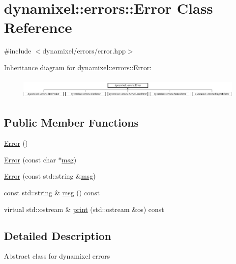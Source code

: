 \hypertarget{classdynamixel_1_1errors_1_1_error}{}\section{dynamixel\+:\+:errors\+:\+:Error Class Reference}
\label{classdynamixel_1_1errors_1_1_error}


{\ttfamily \#include $<$dynamixel/errors/error.\+hpp$>$}

Inheritance diagram for dynamixel\+:\+:errors\+:\+:Error\+:\begin{figure}[H]
\begin{center}
\leavevmode
\includegraphics[height=1.056604cm]{classdynamixel_1_1errors_1_1_error}
\end{center}
\end{figure}
\subsection*{Public Member Functions}
\begin{DoxyCompactItemize}
\item 
\hyperlink{classdynamixel_1_1errors_1_1_error_a7d5d5cc0fea73ae2db4ca84035c7fbfe}{Error} ()
\item 
\hyperlink{classdynamixel_1_1errors_1_1_error_ad41dbbe9f237dbc204eba731de65be5a}{Error} (const char $\ast$\hyperlink{classdynamixel_1_1errors_1_1_error_a4c0804f137545e62204c49fca4c30dcb}{msg})
\item 
\hyperlink{classdynamixel_1_1errors_1_1_error_ab404696702c69bd2e8c49f6032a718f8}{Error} (const std\+::string \&\hyperlink{classdynamixel_1_1errors_1_1_error_a4c0804f137545e62204c49fca4c30dcb}{msg})
\item 
const std\+::string \& \hyperlink{classdynamixel_1_1errors_1_1_error_a4c0804f137545e62204c49fca4c30dcb}{msg} () const 
\item 
virtual std\+::ostream \& \hyperlink{classdynamixel_1_1errors_1_1_error_a12887a555c126d7e3a8ae8425730c8be}{print} (std\+::ostream \&os) const 
\end{DoxyCompactItemize}


\subsection{Detailed Description}
Abstract class for dynamixel errors 

